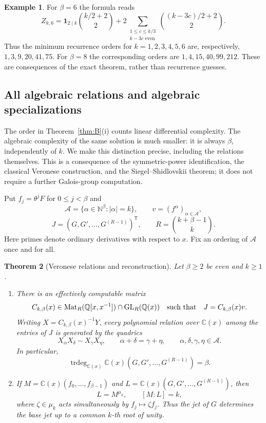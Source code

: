 \documentclass[11pt]{amsart}
\newtheorem{thm}{Theorem}[section]
\theoremstyle{definition}
\newtheorem{example}[thm]{Example}
\newcommand{\C}{\mathbb C}
\newcommand{\N}{\mathbb N}
\newcommand{\Q}{\mathbb Q}
\newcommand{\GL}{\mathrm{GL}}
\begin{document}
\begin{example}
For $\beta=6$ the formula reads
\[
 Z_{k,6}=\mathbf1_{2\mid k}\binom{k/2+2}{2}
 +2\!\!\sum_{\substack{1\le c\le k/3\\ k-3c\text{ even}}}
       \binom{(k-3c)/2+2}{2}.
\]
Thus the minimum recurrence orders for $k=1,2,3,4,5,6$ are,
respectively, $1,3,9,20,41,75$.
For $\beta=8$ the corresponding orders are $1,4,15,40,99,212$.
These are consequences of the exact theorem, rather than recurrence guesses.
\end{example}


\subsection{All algebraic relations and algebraic specializations}
\label{sec:regev-relations}

The order in Theorem~\ref{thm:B}(i) counts linear differential
complexity.  The algebraic complexity of the same solution is much
smaller: it is always $\beta$, independently of $k$.  We make this
distinction precise, including the relations themselves.  This is a
consequence of the symmetric-power identification, the classical
Veronese construction, and the Siegel--Shidlovskii theorem; it does not
require a further Galois-group computation.

Put $f_j=\theta^jF$ for $0\le j<\beta$ and
\[
 \mathcal A=\{\alpha\in\N^\beta:|\alpha|=k\},\qquad
 v=(f^\alpha)_{\alpha\in\mathcal A},
\]
\[
 J=(G,G',\ldots,G^{(R-1)})^{\mathsf T},
 \qquad R=\binom{k+\beta-1}{k}.
\]
Here primes denote ordinary derivatives with respect to $x$.  Fix an
ordering of $\mathcal A$ once and for all.

\begin{thm}[Veronese relations and reconstruction]
\label{thm:regev-veronese}
Let $\beta\ge2$ be even and $k\ge1$.
\begin{enumerate}[label=\textup{(\roman*)}]
\item There is an effectively computable matrix
\[
 C_{k,\beta}(x)\in
 \operatorname{Mat}_{R}(\Q[x,x^{-1}])\cap\GL_R(\Q(x))
 \quad\hbox{such that}\quad J=C_{k,\beta}(x)v.
\]
Writing $X=C_{k,\beta}(x)^{-1}Y$, every polynomial relation over
$\C(x)$ among the entries of $J$ is generated by the quadrics
\begin{equation}\label{eq:veronese-quadrics}
 X_\alpha X_\delta-X_\gamma X_\eta,
 \qquad \alpha+\delta=\gamma+\eta,
 \qquad \alpha,\delta,\gamma,\eta\in\mathcal A.
\end{equation}
In particular,
\[
 \operatorname{trdeg}_{\C(x)}
 \C(x)(G,G',\ldots,G^{(R-1)})=\beta.
\]
\item If $M=\C(x)(f_0,\ldots,f_{\beta-1})$ and
$L=\C(x)(G,G',\ldots,G^{(R-1)})$, then
\[
 L=M^{\mu_k},\qquad [M:L]=k,
\]
where $\zeta\in\mu_k$ acts simultaneously by $f_j\mapsto\zeta f_j$.
Thus the jet of $G$ determines the base jet up to a common $k$-th root
of unity.
\end{enumerate}
\end{thm}
\end{document}
